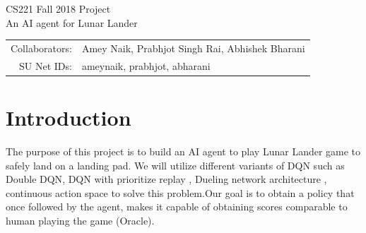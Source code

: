 \documentclass[12pt]{article}
\begin{document}
\begin{center}
{\Large CS221 Fall 2018 Project} \\
{\Large An AI agent for Lunar Lander}

\begin{tabular}{rl}
Collaborators: & Amey Naik, Prabhjot Singh Rai, Abhishek Bharani \\
SU Net IDs: & ameynaik, prabhjot, abharani
\end{tabular}
\end{center}


\section{Introduction}

The purpose of this project is to build an AI agent to play Lunar Lander game to safely land on a landing pad. We will utilize different variants of DQN such as Double DQN\citep{DoubleQ-learning}, DQN with prioritize replay\citep{PrioritizedReplay} , Dueling network architecture \citep{Dueling}, continuous action space \citep{Continuous} to solve this problem.Our goal is to obtain a policy that once followed by the agent, makes it capable of obtaining scores comparable to human playing  the game  (Oracle).
\end{document}
